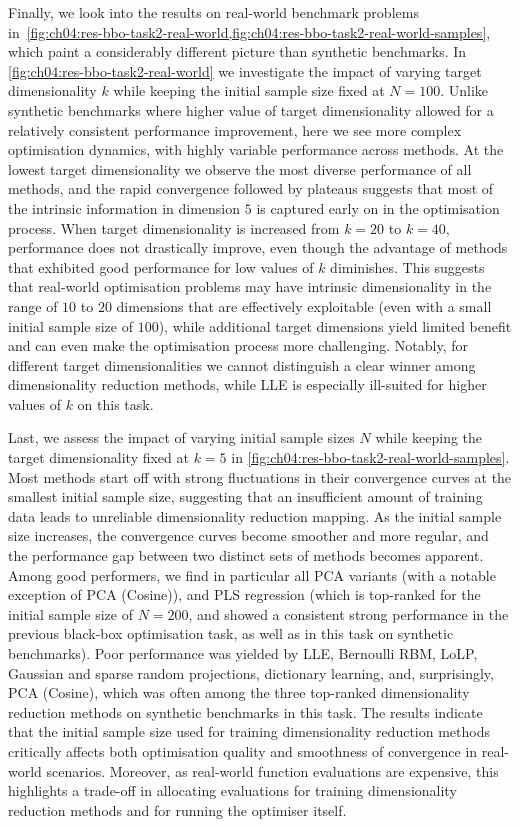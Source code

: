 Finally, we look into the results on real-world benchmark problems in~\cref{fig:ch04:res-bbo-task2-real-world,fig:ch04:res-bbo-task2-real-world-samples}, which paint a considerably different picture than synthetic benchmarks.
In \cref{fig:ch04:res-bbo-task2-real-world} we investigate the impact of varying target dimensionality $k$ while keeping the initial sample size fixed at $N = 100$.
Unlike synthetic benchmarks where higher value of target dimensionality allowed for a relatively consistent performance improvement, here we see more complex optimisation dynamics, with highly variable performance across methods.
At the lowest target dimensionality we observe the most diverse performance of all methods, and the rapid convergence followed by plateaus suggests that most of the intrinsic information in dimension $5$ is captured early on in the optimisation process.
When target dimensionality is increased from $k = 20$ to $k = 40$, performance does not drastically improve, even though the advantage of methods that exhibited good performance for low values of $k$ diminishes.
This suggests that real-world optimisation problems may have intrinsic dimensionality in the range of $10$ to $20$ dimensions that are effectively exploitable (even with a small initial sample size of $100$), while additional target dimensions yield limited benefit and can even make the optimisation process more challenging.
Notably, for different target dimensionalities we cannot distinguish a clear winner among dimensionality reduction methods, while LLE is especially ill-suited for higher values of $k$ on this task.

Last, we assess the impact of varying initial sample sizes $N$ while keeping the target dimensionality fixed at $k = 5$ in \cref{fig:ch04:res-bbo-task2-real-world-samples}.
Most methods start off with strong fluctuations in their convergence curves at the smallest initial sample size, suggesting that an insufficient amount of training data leads to unreliable dimensionality reduction mapping.
As the initial sample size increases, the convergence curves become smoother and more regular, and the performance gap between two distinct sets of methods becomes apparent.
Among good performers, we find in particular all PCA variants (with a notable exception of PCA (Cosine)), and PLS regression (which is top-ranked for the initial sample size of $N = 200$, and showed a consistent strong performance in the previous black-box optimisation task, as well as in this task on synthetic benchmarks).
Poor performance was yielded by LLE, Bernoulli RBM, LoLP, Gaussian and sparse random projections, dictionary learning, and, surprisingly, PCA (Cosine), which was often among the three top-ranked dimensionality reduction methods on synthetic benchmarks in this task.
The results indicate that the initial sample size used for training dimensionality reduction methods critically affects both optimisation quality and smoothness of convergence in real-world scenarios.
Moreover, as real-world function evaluations are expensive, this highlights a trade-off in allocating evaluations for training dimensionality reduction methods and for running the optimiser itself.

